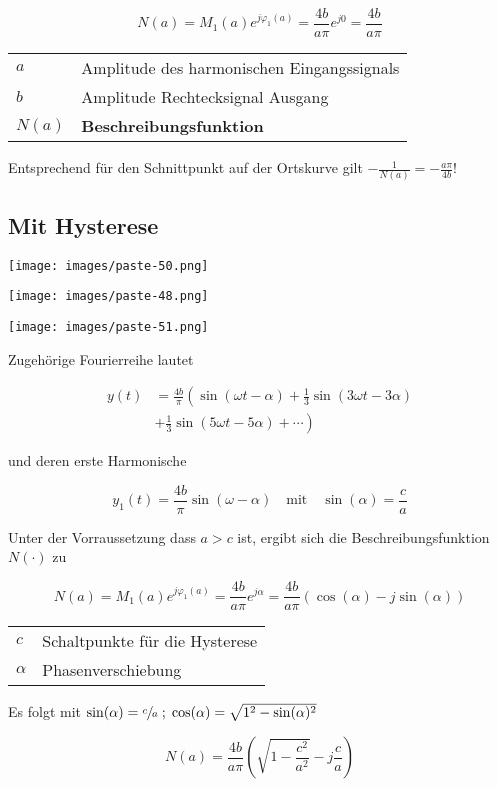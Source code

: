\documentclass[
  10pt,
  a4paper,
  twocolumn]{article}
\makeatletter
\numberwithin{equation}{section}
\newenvironment{conditions}
  {\par\vspace{\abovedisplayskip}\noindent\begin{tabular}{>{$}l<{$} @{${}:{}$} l}}
  {\end{tabular}\par\vspace{\belowdisplayskip}}
\makeatother
\begin{document}
\[
N(a) = M_1(a)e^{j\varphi_1(a)}=\frac{4b}{a\pi}e^{j0}=\frac{4b}{a\pi}
\]

\begin{conditions}
  a & Amplitude des harmonischen Eingangssignals \\
  b & Amplitude Rechtecksignal Ausgang \\
  N(a) & \textbf{Beschreibungsfunktion}
\end{conditions}

Entsprechend für den Schnittpunkt auf der Ortskurve gilt
\(-\frac1{N(a)}=-\frac{a\pi}{4b}\)!

\subsection{Mit Hysterese}\label{mit-hysterese}

\texttt{[image: images/paste-50.png]}

\texttt{[image: images/paste-48.png]}

\texttt{[image: images/paste-51.png]}

Zugehörige Fourierreihe lautet

\[
\begin{split}
y(t) &= \frac{4b}{\pi}\left(\sin(\omega t-\alpha) + \frac1{3}\sin(3\omega t-3\alpha)\right. \\
     &+ \left.\frac1{3}\sin(5\omega t-5\alpha)+\cdots\right)
\end{split}
\]

und deren erste Harmonische

\[
y_1(t)=\frac{4b}{\pi}\sin(\omega-\alpha)\quad\text{mit}\quad \sin(\alpha)=\frac{c}{a}
\]

Unter der Vorraussetzung dass \(a > c\) ist, ergibt sich die
Beschreibungsfunktion \(N(\cdot)\) zu

\[
N(a)= M_1(a)e^{j\varphi_1(a)}=\frac{4b}{a\pi}e^{j\alpha}=\frac{4b}{a\pi}(\cos(\alpha)-j\sin(\alpha))
\]

\begin{conditions}
  c & Schaltpunkte für die Hysterese \\
  \alpha & Phasenverschiebung
\end{conditions}

Es folgt mit
\(\sin(\alpha)=\sfrac{c}{a}\;;\; \cos(\alpha)=\sqrt{1^2-\sin(\alpha)^2}\)

\[
N(a)=\frac{4b}{a\pi}\left(\sqrt{1-\frac{c^2}{a^2}}-j\frac{c}{a}\right)
\]
\end{document}
